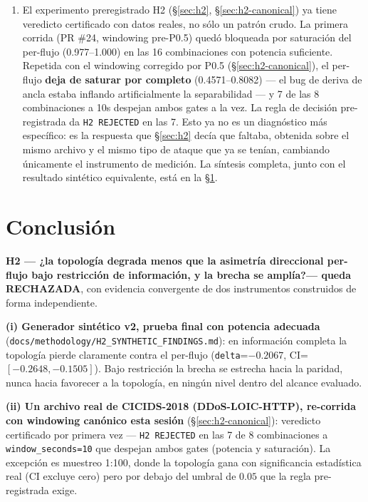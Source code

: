 \documentclass[11pt]{article}
\newcommand{\code}[1]{\texttt{\small #1}}
\begin{document}
\begin{enumerate}[leftmargin=1.4em]
  la clase ataque, no un ROC-AUC que el desbalanceo puede inflar. La respuesta depende
  enteramente del régimen: bajo visibilidad completa (lo único que hay hoy), DDoS satura
  (precisión=recall=F1=1.000, verificado que no es un confound de una sola columna) e
  Infiltración queda fuerte pero no perfecta (F1(ataque) 0.58--0.59).
\item El experimento preregistrado H2 (\S\ref{sec:h2}, \S\ref{sec:h2-canonical}) ya tiene
  veredicto certificado con datos reales, no sólo un patrón crudo. La primera corrida (PR
  \#24, windowing pre-P0.5) quedó bloqueada por saturación del per-flujo (0.977--1.000) en
  las 16 combinaciones con potencia suficiente. Repetida con el windowing corregido por
  P0.5 (\S\ref{sec:h2-canonical}), el per-flujo \textbf{deja de saturar por completo}
  (0.4571--0.8082) --- el bug de deriva de ancla estaba inflando artificialmente la
  separabilidad --- y 7 de las 8 combinaciones a 10s despejan ambos gates a la vez. La
  regla de decisión pre-registrada da \code{H2 REJECTED} en las 7. Esto ya no es un
  diagnóstico más específico: es la respuesta que \S\ref{sec:h2} decía que faltaba,
  obtenida sobre el mismo archivo y el mismo tipo de ataque que ya se tenían, cambiando
  únicamente el instrumento de medición. La síntesis completa, junto con el resultado
  sintético equivalente, está en la \S\ref{sec:conclusion}.
\end{enumerate}

\section{Conclusión}
\label{sec:conclusion}

\textbf{H2 --- ¿la topología degrada menos que la asimetría direccional per-flujo bajo
restricción de información, y la brecha se amplía?--- queda RECHAZADA}, con evidencia
convergente de dos instrumentos construidos de forma independiente.

\textbf{(i) Generador sintético v2, prueba final con potencia adecuada}
(\code{docs/methodology/H2\_SYNTHETIC\_FINDINGS.md}): en información completa la topología
pierde claramente contra el per-flujo (\texttt{delta}=$-0.2067$,
CI=$[-0.2648,-0.1505]$). Bajo restricción la brecha se estrecha hacia la paridad, nunca
hacia favorecer a la topología, en ningún nivel dentro del alcance evaluado.

\textbf{(ii) Un archivo real de CICIDS-2018 (DDoS-LOIC-HTTP), re-corrida con windowing
canónico esta sesión} (\S\ref{sec:h2-canonical}): veredicto certificado por primera vez ---
\code{H2 REJECTED} en las 7 de 8 combinaciones a \code{window\_seconds=10} que despejan
ambos gates (potencia y saturación). La excepción es muestreo 1:100, donde la topología
gana con significancia estadística real (CI excluye cero) pero por debajo del umbral de
$0.05$ que la regla pre-registrada exige.
\end{document}
